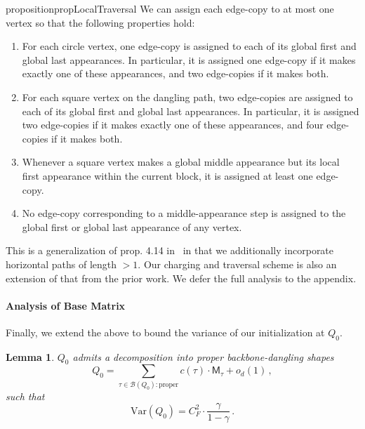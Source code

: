 \documentclass[12pt]{article}
\newcommand{\Var}{\mathrm{Var}}
\newtheorem{lemma}[theorem]{Lemma}
\newcommand{\calB}{\mathcal{B}}
\newcommand{\gam}{\gamma}
\newcommand{\cm}{\mathsf{M} }
\begin{document}
\begin{restatable}{proposition}{propLocalTraversal}
\label{prop:local-traversal}
We can assign each edge-copy to at most one vertex so that the following properties hold:
\begin{enumerate}
    \item For each circle vertex, one edge-copy is assigned to each of its global first and global last appearances. In particular, it is assigned one edge-copy if it makes exactly one of these appearances, and two edge-copies if it makes both.

    \item For each square vertex on the dangling path, two edge-copies are assigned to each of its global first and global last appearances. In particular, it is assigned two edge-copies if it makes exactly one of these appearances, and four edge-copies if it makes both.

    \item Whenever a square vertex makes a global middle appearance but its local first appearance within the current block, it is assigned at least one edge-copy.

    \item No edge-copy corresponding to a middle-appearance step is assigned to the global first or global last appearance of any vertex.
\end{enumerate}
\end{restatable}



 This is a generalization of prop. 4.14 in~\cite{HKPX23} in that we additionally incorporate horizontal paths of length $>1$. Our charging and traversal scheme is also an extension of that from the prior work. We defer the full analysis to the appendix. 

\paragraph{Analysis of Base Matrix}
Finally, we extend the above to bound the variance of our initialization at $Q_0$.
\begin{lemma}
	$Q_0$ admits a decomposition into proper backbone-dangling shapes \[
	Q_0 = \sum_{\tau\in \calB(Q_0):\text{proper}} c(\tau) \cdot \cm_\tau  + o_d(1) \,,
	\]
	such that \[ 
	\Var(Q_0) = C_F^2 \cdot \frac{\gamma}{1-\gam}\,.
	\]
\end{lemma}
\end{document}

